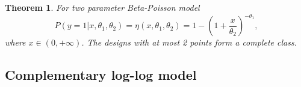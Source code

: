 \documentclass[11pt]{amsart}
\newtheorem{theorem}{Theorem}[section]
\theoremstyle{definition}
\theoremstyle{remark}
\numberwithin{equation}{section}
\begin{document}


\begin{theorem}\label{beta}
For two parameter Beta-Poisson model \[
P(y=1|x,\theta_1,\theta_2) = \eta(x,\theta_1,\theta_2)= 1-(1+\frac{x}{\theta_2})^{-\theta_1},
\] where $x\in (0,+\infty)$.  The designs with at most 2 points form a complete class.
\end{theorem}

\subsection{Complementary log-log model } 
\end{document}
